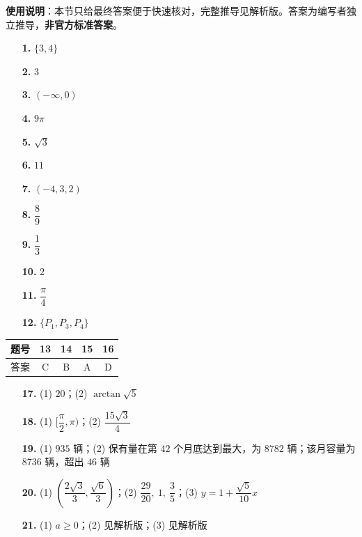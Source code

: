 
\begin{gknotice}
\textbf{使用说明}：本节只给最终答案便于快速核对，完整推导见解析版。答案为编写者独立推导，\textbf{非官方标准答案}。
\end{gknotice}

\begin{itemize}[leftmargin=2.6em]
  \item[\textbf{1.}] $\{3,4\}$
  \item[\textbf{2.}] $3$
  \item[\textbf{3.}] $(-\infty,0)$
  \item[\textbf{4.}] $9\pi$
  \item[\textbf{5.}] $\sqrt3$
  \item[\textbf{6.}] $11$
  \item[\textbf{7.}] $(-4,3,2)$
  \item[\textbf{8.}] $\dfrac89$
  \item[\textbf{9.}] $\dfrac13$
  \item[\textbf{10.}] $2$
  \item[\textbf{11.}] $\dfrac\pi4$
  \item[\textbf{12.}] $\{P_1,P_3,P_4\}$
\end{itemize}

\begin{center}\begin{tabular}{ccccc}
\toprule
题号 & 13 & 14 & 15 & 16 \\
\midrule
答案 & C & B & A & D \\
\bottomrule
\end{tabular}\end{center}

\begin{itemize}[leftmargin=2.6em]
  \item[\textbf{17.}] (1) $20$；(2) $\arctan\sqrt5$
  \item[\textbf{18.}] (1) $[\dfrac\pi2,\pi)$；(2) $\dfrac{15\sqrt3}{4}$
  \item[\textbf{19.}] (1) $935$ 辆；(2) 保有量在第 $42$ 个月底达到最大，为 $8782$ 辆；该月容量为 $8736$ 辆，超出 $46$ 辆
  \item[\textbf{20.}] (1) $(\dfrac{2\sqrt3}{3},\dfrac{\sqrt6}{3})$；(2) $\dfrac{29}{20},\ 1,\ \dfrac35$；(3) $y=1+\dfrac{\sqrt5}{10}x$
  \item[\textbf{21.}] (1) $a\geqslant0$；(2) 见解析版；(3) 见解析版
\end{itemize}
